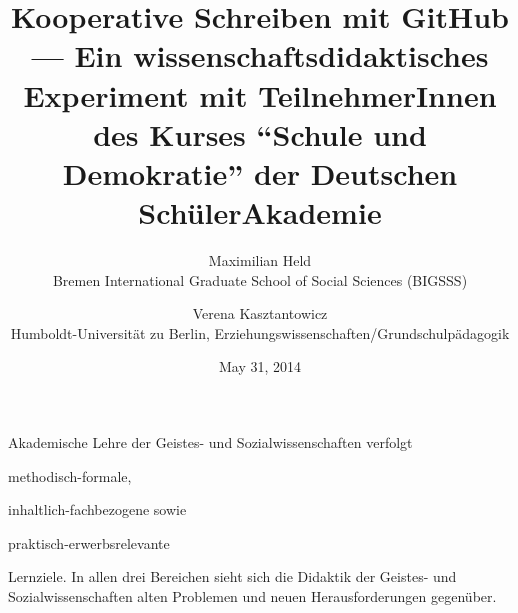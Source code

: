 \documentclass[11pt,a4paper,oneside]{article}
\title{
	Kooperative Schreiben mit GitHub ---
	Ein wissenschaftsdidaktisches Experiment mit TeilnehmerInnen des Kurses ``Schule und Demokratie'' der Deutschen SchülerAkademie
}
\date{May 31, 2014}
\author{
	Maximilian Held\\
	Bremen International Graduate School of Social Sciences (BIGSSS)
	\and
	Verena Kasztantowicz\\
	Humboldt-Universität zu Berlin, Erziehungswissenschaften/Grundschulpädagogik
}
\begin{document}
\maketitle




Akademische Lehre der Geistes- und Sozialwissenschaften verfolgt
\begin{inparaenum}
	\item methodisch-formale,
	\item inhaltlich-fachbezogene sowie
	\item praktisch-erwerbsrelevante
\end{inparaenum}
Lernziele.
In allen drei Bereichen sieht sich die Didaktik der Geistes- und Sozialwissenschaften alten Problemen und neuen Herausforderungen gegenüber.
\end{document}
